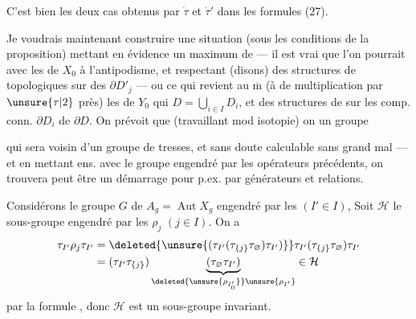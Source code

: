 C'est bien les deux cas obtenus  par $\dot\tau$ et $\dot\tau'$ dans les formules (27).

Je voudrais maintenant construire une situation (sous les conditions de la proposition) mettant en évidence un maximum de  --- il est vrai que l'on pourrait  avec  les  de $X_0$  à l'antipodisme\inserted{$\tau$},  et respectant (disons) des structures de  topologiques sur  des $\partial D'_j$ --- ou ce qui revient  au $\overline{\mathrm m}$ (à  de multiplication par $\unsure{\tau|2}$ près) les  de $Y_0$ qui   $D=\bigcup_{i\in I}D_i$, et  des structures de  sur  les comp. conn. $\partial D_i$ de $\partial D$. On prévoit que (travaillant mod isotopie) on  un groupe


qui sera voisin d'un groupe de tresses, et sans doute calculable sans grand mal --- et en  mettant ens. avec le groupe engendré par les opérateurs précédents, on trouvera peut être un démarrage pour  p.ex.  par générateurs  et relations.

Considérons le  groupe $G$ de $A_g=\operatorname{Aut}X_g$ engendré par les  $(I'\in I)$,  Soit $\mathcal H$  le sous-groupe engendré par les $\rho_j$ $(j\in I)$. On a
\[
\begin{aligned}
\tau_{I'}\rho_j\tau_{I'}
&=\deleted{\unsure{(\tau_{I'}(\tau_{\{j\}}\tau_{\varnothing})\tau_{I'})}}
\tau_{I'}(\tau_{\{j\}}\tau_{\varnothing})\tau_{I'}\\
&=(\tau_{I'}\tau_{\{j\}})
\underbrace{(\tau_{\varnothing}\tau_{I'})}_{\deleted{\unsure{\rho_{I'_0}}}\unsure{\rho_{I'}}}
\in\mathcal H
\end{aligned}
\]
par la formule , donc $\mathcal H$ est un sous-groupe invariant.

